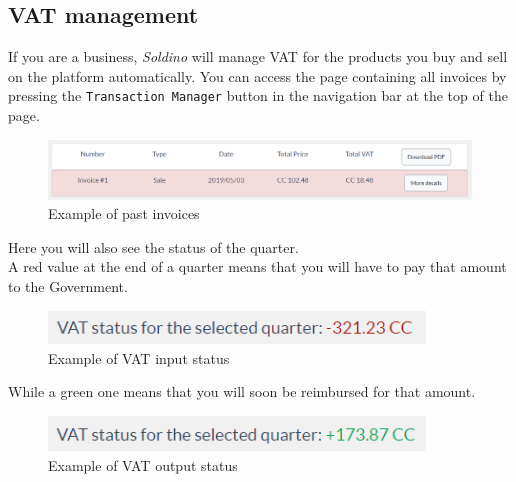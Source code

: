 	\subsection{VAT management}
	If you are a business, \textit{Soldino} will manage VAT for the products 
	you buy and sell on the platform automatically. You can access the page 
	containing all invoices by pressing the \texttt{Transaction Manager} button 
	in the navigation bar at the top of the page.
	\begin{figure}[H]
		\includegraphics[width=15cm]{res/images/past_invoices.png}
		\centering
		\caption{Example of past invoices}
	\end{figure}
	\noindent Here you will also see the status of the quarter. 
	\\A red value at the end of a quarter means that you will have to pay 
	that amount to the Government.
	\begin{figure}[H]
		\includegraphics[width=10cm]{res/images/negative_vat_status.png}
		\centering
		\caption{Example of VAT input status}
	\end{figure}
	\noindent While a green one means that you will 
	soon be reimbursed for that amount.
	\begin{figure}[H]
		\includegraphics[width=10cm]{res/images/positive_vat_status.png}
		\centering
		\caption{Example of VAT output status}
	\end{figure}
